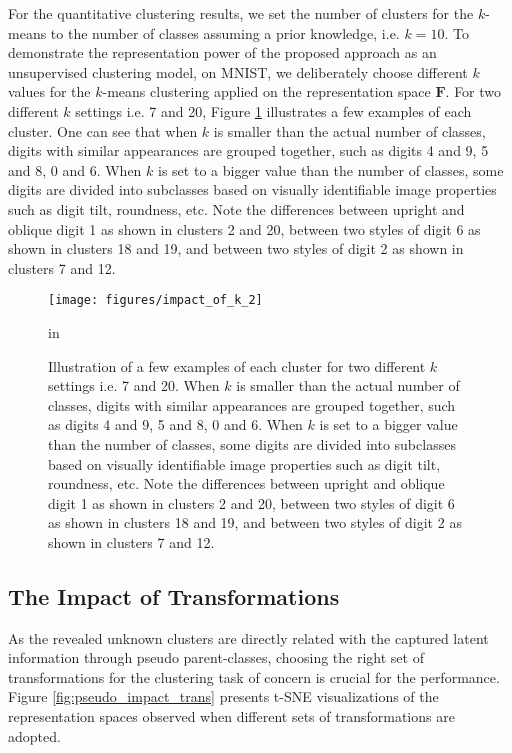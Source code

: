 \documentclass{article} \usepackage{iclr2018_conference,times}
\begin{document}
For the quantitative clustering results, we set the number of clusters for the $k$-means to the number of classes assuming a prior knowledge, i.e. $k=10$. To demonstrate the representation power of the proposed approach as an unsupervised clustering model, on MNIST, we deliberately choose different $k$ values for the $k$-means clustering applied on the representation space $\boldsymbol{F}$. For two different $k$ settings i.e. 7 and 20, Figure \ref{fig:pseudo_impact_k} illustrates a few examples of each cluster. One can see that when $k$ is smaller than the actual number of classes, digits with similar appearances are grouped together, such as digits 4 and 9, 5 and 8, 0 and 6. When $k$ is set to a bigger value than the number of classes, some digits are divided into subclasses based on visually identifiable image properties such as digit tilt, roundness, etc. Note the differences between upright and oblique digit 1 as shown in clusters 2 and 20, between two styles of digit 6 as shown in clusters 18 and 19, and between two styles of digit 2 as shown in clusters 7 and 12.
\begin{figure}[h]
	\begin{center}
		\centerline{\texttt{[image: figures/impact\_of\_k\_2]}}
		\caption{Illustration of a few examples of each cluster for two different $k$ settings i.e. 7 and 20. When $k$ is smaller than the actual number of classes, digits with similar appearances are grouped together, such as digits 4 and 9, 5 and 8, 0 and 6. When $k$ is set to a bigger value than the number of classes, some digits are divided into subclasses based on visually identifiable image properties such as digit tilt, roundness, etc. Note the differences between upright and oblique digit 1 as shown in clusters 2 and 20, between two styles of digit 6 as shown in clusters 18 and 19, and between two styles of digit 2 as shown in clusters 7 and 12.}
		\label{fig:pseudo_impact_k}
	\end{center}
	 in
\end{figure}

\subsection{The Impact of Transformations}

As the revealed unknown clusters are directly related with the captured latent information through pseudo parent-classes, choosing the right set of transformations for the clustering task of concern is crucial for the performance. Figure \ref{fig:pseudo_impact_trans} presents t-SNE visualizations of the representation spaces observed when different sets of transformations are adopted.
\end{document}
